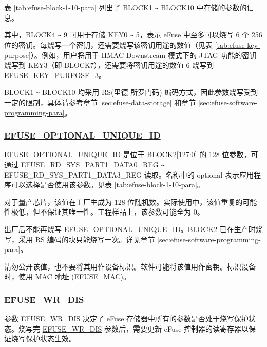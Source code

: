 \documentclass[main\_\_CN.tex]{subfiles}
\begin{document}



表 \ref{tab:efuse-block-1-10-para} 列出了 BLOCK1 \verb+~+ BLOCK10 中存储的参数的信息。



其中，BLOCK4 \verb+~+ 9 可用于存储 KEY0 \verb+~+ 5，表示 eFuse 中至多可以烧写 6 个 256 位的密钥。每烧写一个密钥，还需要烧写该密钥用途的数值（见表 \ref{tab:efuse-key-purpose}）。例如，用户将用于 HMAC Downstream 模式下的 JTAG 功能的密钥烧写到 KEY\textcolor{myred}{3}（即 BLOCK7），还需要将密钥用途的数值 6 烧写到 EFUSE\_KEY\_PURPOSE\_\textcolor{myred}{3}。


BLOCK1 \verb+~+ BLOCK10 均采用 RS(里德-所罗门码) 编码方式，因此参数烧写受到一定的限制，具体请参考章节 \ref{sec:efuse-data-storage} 和章节 \ref{sec:efuse-software-programming-para}。

\subsubsection{\texorpdfstring{\hyperref[fielddesc:EFUSEOPTIONALUNIQUEID]{EFUSE\_OPTIONAL\_UNIQUE\_ID}}{EFUSE\_OPTIONAL\_UNIQUE\_ID}}
\label{sec:efuse-optional-unique-id}

EFUSE\_OPTIONAL\_UNIQUE\_ID 是位于 BLOCK2[127:0] 的 128 位参数，可通过 EFUSE\_RD\_SYS\_PART1\_DATA0\_REG \verb+~+ EFUSE\_RD\_SYS\_PART1\_DATA3\_REG 读取。名称中的 optional 表示应用程序可以选择是否使用该参数。见表 \ref{tab:efuse-block-1-10-para}。

对于量产芯片，该值在工厂生成为 128 位随机数。实际使用中，该值重复的可能性极低，但不保证其唯一性。工程样品上，该参数可能全为 0。

出厂后不能再烧写 EFUSE\_OPTIONAL\_UNIQUE\_ID。BLOCK2 已在生产时烧写，采用 RS 编码的块只能烧写一次。详见章节 \ref{sec:efuse-software-programming-para}。

请勿公开该值，也不要将其用作设备标识。软件可能将该值用作密钥。标识设备时，使用 MAC 地址 (EFUSE\_MAC)。

\subsubsection{EFUSE\_WR\_DIS}
\label{sec:efuse-wr-dis}

参数 \hyperref[fielddesc:EFUSEWRDIS]{EFUSE\_WR\_DIS} 决定了 eFuse 存储器中所有的参数是否处于烧写保护状态。烧写完 \hyperref[fielddesc:EFUSEWRDIS]{EFUSE\_WR\_DIS} 参数后，需要更新 eFuse 控制器的读寄存器以保证烧写保护状态生效。
\end{document}
